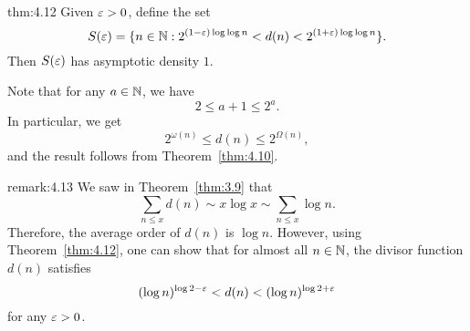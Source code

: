 \begin{theo}{thm:4.12} 
    Given $\varepsilon > 0$, define the set 
    \[ S(\varepsilon) = \{n \in \mathbb{N} : 2^{(1-\varepsilon)\log\log n} < d(n) < 2^{(1+\varepsilon)\log\log n} \}. \] 
    Then $S(\varepsilon)$ has asymptotic density $1$. 
\end{theo}
\begin{pf}
    Note that for any $a \in \mathbb{N}$, we have 
    \[ 2 \leq a + 1 \leq 2^a. \] 
    In particular, we get 
    \[ 2^{\omega(n)} \leq d(n) \leq 2^{\Omega(n)}, \] 
    and the result follows from Theorem~\ref{thm:4.10}. 
\end{pf}

\begin{remark}{remark:4.13}
    We saw in Theorem~\ref{thm:3.9} that 
    \[ \sum_{n\leq x} d(n) \sim x\log x \sim \sum_{n\leq x}\log n. \] 
    Therefore, the average order of $d(n)$ is $\log n$. However, using 
    Theorem~\ref{thm:4.12}, one can show that for almost all $n \in \mathbb{N}$, the 
    divisor function $d(n)$ satisfies 
    \[ (\log n)^{\log 2 - \varepsilon} < d(n) < (\log n)^{\log 2 + \varepsilon} \] 
    for any $\varepsilon > 0$. 
\end{remark}